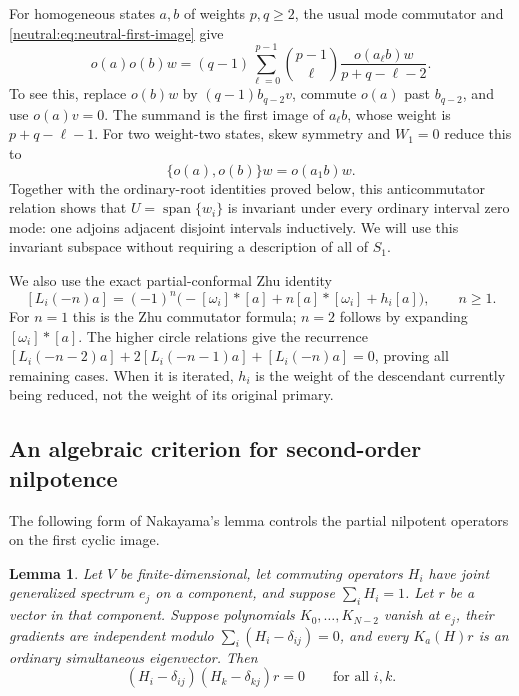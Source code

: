 \documentclass[11pt,a4paper]{article}
\numberwithin{equation}{section}
\newtheorem{lemma}[theorem]{Lemma}
\theoremstyle{definition}\newtheorem{definition}[theorem]{Definition}
\theoremstyle{remark}\newtheorem{remark}[theorem]{Remark}
\begin{document}
For homogeneous states $a,b$ of weights $p,q\geq2$, the usual mode
commutator and \eqref{neutral:eq:neutral-first-image} give
\begin{equation}\label{neutral:eq:neutral-defect-product}
 o(a)o(b)w=(q-1)\sum_{\ell=0}^{p-1}
 \binom{p-1}{\ell}\frac{o(a_\ell b)w}{p+q-\ell-2}.
\end{equation}
To see this, replace $o(b)w$ by $(q-1)b_{q-2}v$, commute $o(a)$ past
$b_{q-2}$, and use $o(a)v=0$.  The summand is the first image of
$a_\ell b$, whose weight is $p+q-\ell-1$.
For two weight-two states, skew symmetry and $W_1=0$ reduce this to
\[
                       \{o(a),o(b)\}w=o(a_1b)w.
\]
Together with the ordinary-root identities proved below, this
anticommutator relation shows that
$U=\operatorname{span}\{w_i\}$ is invariant under every ordinary
interval zero mode: one adjoins adjacent disjoint intervals
inductively.  We will use this invariant subspace without requiring
a description of all of $S_1$.

We also use the exact partial-conformal Zhu identity
\begin{equation}\label{neutral:eq:neutral-partial-Zhu}
 [L_i(-n)a]=(-1)^n\bigl(-[\omega_i]*[a]+n[a]*[\omega_i]+h_i[a]\bigr),
                          \qquad n\geq1.
\end{equation}
For $n=1$ this is the Zhu commutator formula; $n=2$ follows by expanding
$[\omega_i]*[a]$.  The higher circle relations give the recurrence
$[L_i(-n-2)a]+2[L_i(-n-1)a]+[L_i(-n)a]=0$, proving all remaining
cases.  When it is iterated, $h_i$ is the weight of the descendant
currently being reduced, not the weight of its original primary.

\subsection{An algebraic criterion for second-order nilpotence}

The following form of Nakayama's lemma controls the partial
nilpotent operators on the first cyclic image.

\begin{lemma}\label{neutral:lem:cut-Nakayama}
Let $V$ be finite-dimensional, let commuting operators $H_i$ have
joint generalized spectrum $e_j$ on a component, and suppose
$\sum_i H_i=1$.  Let $r$ be a vector in that component.  Suppose
polynomials $K_0,\ldots,K_{N-2}$ vanish at $e_j$, their gradients are
independent modulo $\sum_i(H_i-\delta_{ij})=0$, and every $K_a(H)r$
is an ordinary simultaneous eigenvector.  Then
\[
 (H_i-\delta_{ij})(H_k-\delta_{kj})r=0\qquad\text{for all }i,k.
\]
\end{lemma}
\end{document}

